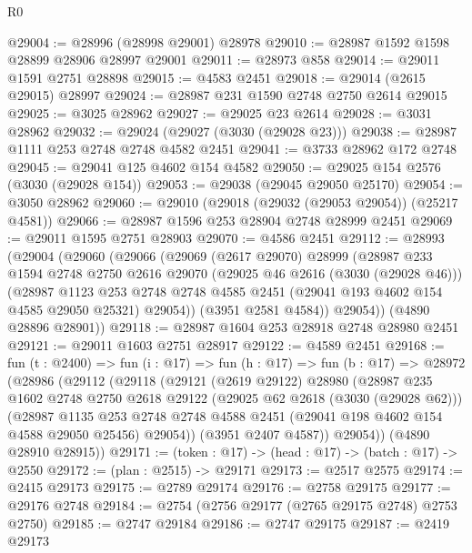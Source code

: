 \begin{lexlean}{R0}
\begin{coremodule}
@29004 := @28996 (@28998 @29001) @28978
@29010 := @28987 @1592 @1598 @28899 @28906 @28997 @29001
@29011 := @28973 @858
@29014 := @29011 @1591 @2751 @28898
@29015 := @4583 @2451
@29018 := @29014 (@2615 @29015) @28997
@29024 := @28987 @231 @1590 @2748 @2750 @2614 @29015
@29025 := @3025 @28962
@29027 := @29025 @23 @2614
@29028 := @3031 @28962
@29032 := @29024 (@29027 (@3030 (@29028 @23)))
@29038 := @28987 @1111 @253 @2748 @2748 @4582 @2451
@29041 := @3733 @28962 @172 @2748
@29045 := @29041 @125 @4602 @154 @4582
@29050 := @29025 @154 @2576 (@3030 (@29028 @154))
@29053 := @29038 (@29045 @29050 @25170)
@29054 := @3050 @28962
@29060 := @29010 (@29018 (@29032 (@29053 @29054)) (@25217 @4581))
@29066 := @28987 @1596 @253 @28904 @2748 @28999 @2451
@29069 := @29011 @1595 @2751 @28903
@29070 := @4586 @2451
@29112 := @28993
    (@29004
      (@29060
        (@29066
          (@29069
            (@2617 @29070)
            @28999
            (@28987
              @233
              @1594
              @2748
              @2750
              @2616
              @29070
              (@29025 @46 @2616 (@3030 (@29028 @46)))
              (@28987
                @1123
                @253
                @2748
                @2748
                @4585
                @2451
                (@29041 @193 @4602 @154 @4585 @29050 @25321)
                @29054))
            (@3951 @2581 @4584))
          @29054))
      (@4890 @28896 @28901))
@29118 := @28987 @1604 @253 @28918 @2748 @28980 @2451
@29121 := @29011 @1603 @2751 @28917
@29122 := @4589 @2451
@29168 := fun (t : @2400) =>
  fun (i : @17) =>
  fun (h : @17) =>
  fun (b : @17) =>
  @28972
    (@28986
      (@29112
        (@29118
          (@29121
            (@2619 @29122)
            @28980
            (@28987
              @235
              @1602
              @2748
              @2750
              @2618
              @29122
              (@29025 @62 @2618 (@3030 (@29028 @62)))
              (@28987
                @1135
                @253
                @2748
                @2748
                @4588
                @2451
                (@29041 @198 @4602 @154 @4588 @29050 @25456)
                @29054))
            (@3951 @2407 @4587))
          @29054))
      (@4890 @28910 @28915))
@29171 := (token : @17) -> (head : @17) -> (batch : @17) -> @2550
@29172 := (plan : @2515) -> @29171
@29173 := @2517 @2575
@29174 := @2415 @29173
@29175 := @2789 @29174
@29176 := @2758 @29175
@29177 := @29176 @2748
@29184 := @2754 (@2756 @29177 (@2765 @29175 @2748) @2753 @2750)
@29185 := @2747 @29184
@29186 := @2747 @29175
@29187 := @2419 @29173

\end{coremodule}
\end{lexlean}
